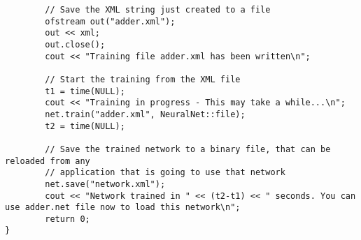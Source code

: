 \begin{DocInclude}
\begin{verbatim}
        // Save the XML string just created to a file
        ofstream out("adder.xml");
        out << xml;
        out.close();
        cout << "Training file adder.xml has been written\n";

        // Start the training from the XML file
        t1 = time(NULL);
        cout << "Training in progress - This may take a while...\n";
        net.train("adder.xml", NeuralNet::file);
        t2 = time(NULL);

        // Save the trained network to a binary file, that can be reloaded from any
        // application that is going to use that network
        net.save("network.xml");
        cout << "Network trained in " << (t2-t1) << " seconds. You can use adder.net file now to load this network\n";
        return 0;
}

\end{verbatim}
\end{DocInclude}
 